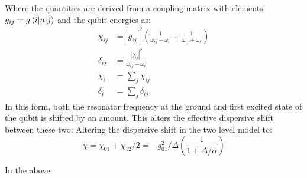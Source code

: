 Where the quantities are derived from a coupling matrix with elements $g_{ij} = g \mel{i}{n}{j}$ and the qubit energies as:
\begin{align}
    \chi_{ij} &= |g_{ij}|^2 \left(\frac{1}{\omega_{ij} - \omega_r} + \frac{1}{\omega_{ij} + \omega_r} \right) \\
    \delta_{ij} &= \frac{|g_{ij}|^2 }{\omega_{ij} - \omega_r} \\
    \chi_{i} &= \sum_j \chi_{ij} \\
    \delta_{i} &= \sum_j \delta_{ij} 
\end{align}
In this form, both the resonator frequency at the ground and first excited state of the qubit is shifted by an amount. This alters the effective dispersive shift between these two:
Altering the dispersive shift in the two level model to\cite{krantz_quantum_2019}: 
\begin{equation}
    \chi = \chi_{01} + \chi_{12}/2 = - g_{01}^2/\Delta \left(\frac{1}{1 + \Delta / \alpha}\right)
\end{equation}

In the above 



